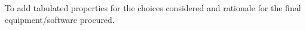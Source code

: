 To add tabulated properties for the choices considered and rationale for the final equipment/software procured.




